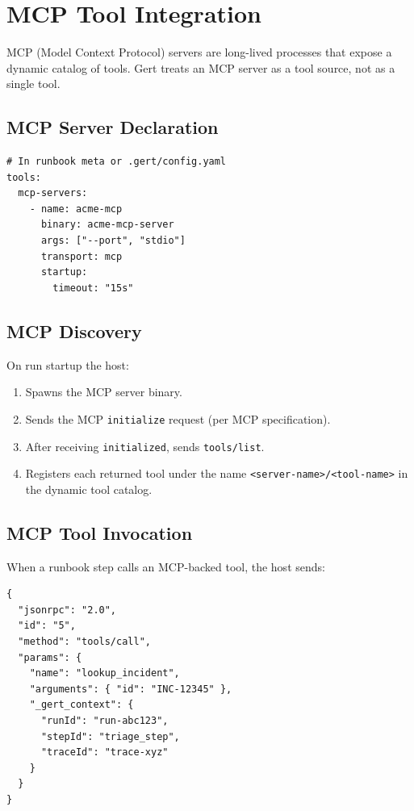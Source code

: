 \section{MCP Tool Integration}
\label{sec:mcp-tools}

MCP (Model Context Protocol) servers are long-lived processes that expose a
dynamic catalog of tools.  Gert treats an MCP server as a tool source, not as
a single tool.

\subsection{MCP Server Declaration}

\begin{verbatim}
# In runbook meta or .gert/config.yaml
tools:
  mcp-servers:
    - name: acme-mcp
      binary: acme-mcp-server
      args: ["--port", "stdio"]
      transport: mcp
      startup:
        timeout: "15s"
\end{verbatim}

\subsection{MCP Discovery}

On run startup the host:

\begin{enumerate}
  \item Spawns the MCP server binary.
  \item Sends the MCP \texttt{initialize} request (per MCP specification).
  \item After receiving \texttt{initialized}, sends \texttt{tools/list}.
  \item Registers each returned tool under the name
        \texttt{<server-name>/<tool-name>} in the dynamic tool catalog.
\end{enumerate}

\subsection{MCP Tool Invocation}

When a runbook step calls an MCP-backed tool, the host sends:

\begin{verbatim}
{
  "jsonrpc": "2.0",
  "id": "5",
  "method": "tools/call",
  "params": {
    "name": "lookup_incident",
    "arguments": { "id": "INC-12345" },
    "_gert_context": {
      "runId": "run-abc123",
      "stepId": "triage_step",
      "traceId": "trace-xyz"
    }
  }
}
\end{verbatim}

